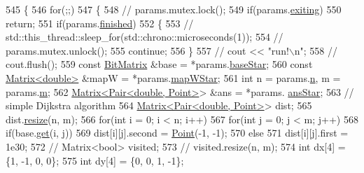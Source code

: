\begin{DoxyCode}
545 \{
546     \textcolor{keywordflow}{for}(;;)
547     \{
548         \textcolor{comment}{// params.mutex.lock();}
549         \textcolor{keywordflow}{if}(params.\hyperlink{structColumnGenSolve_1_1parDijkstraParams_a56efc1b9b760d7a8934f06406e2e61a0}{exiting})
550             \textcolor{keywordflow}{return};
551         \textcolor{keywordflow}{if}(params.\hyperlink{structColumnGenSolve_1_1parDijkstraParams_a72bfc9f9b0c4851bdb63715b053df511}{finished})
552         \{
553             \textcolor{comment}{// std::this\_thread::sleep\_for(std::chrono::microseconds(1));}
554             \textcolor{comment}{// params.mutex.unlock();}
555             \textcolor{keywordflow}{continue};
556         \}
557         \textcolor{comment}{// cout << "run!\(\backslash\)n";}
558         \textcolor{comment}{// cout.flush();}
559         \textcolor{keyword}{const} \hyperlink{classBitMatrix}{BitMatrix} &base = *params.\hyperlink{structColumnGenSolve_1_1parDijkstraParams_a6d66ec75238960aaf04d2d62058ea077}{baseStar};
560         \textcolor{keyword}{const} \hyperlink{classMatrix}{Matrix<double>} &mapW = *params.\hyperlink{structColumnGenSolve_1_1parDijkstraParams_ae0b35a1ba11e00c8ce3113b2a174042d}{mapWStar};
561         \textcolor{keywordtype}{int} n = params.\hyperlink{structColumnGenSolve_1_1parDijkstraParams_a33cbd8316dde8102d996c01ad2ae68d5}{n}, m = params.\hyperlink{structColumnGenSolve_1_1parDijkstraParams_a20f153fdd04ede56c8ec19f155e1e423}{m};
562         \hyperlink{classMatrix}{Matrix<Pair<double, Point>}> &ans = *params.
      \hyperlink{structColumnGenSolve_1_1parDijkstraParams_a6e3c1462f7a9a1714c190a83819cf632}{ansStar};
563         \textcolor{comment}{// simple Dijkstra algorithm}
564         \hyperlink{classMatrix}{Matrix<Pair<double, Point>}> dist;
565         dist.\hyperlink{classMatrix_a15ce96c8af4c7a982c2c10b96f29cea1}{resize}(n, m);
566         \textcolor{keywordflow}{for}(\textcolor{keywordtype}{int} i = 0; i < n; i++)
567             \textcolor{keywordflow}{for}(\textcolor{keywordtype}{int} j = 0; j < m; j++)
568                 \textcolor{keywordflow}{if}(base.\hyperlink{classBitMatrix_ad19d1045b54ccc8a99d70d38305b4ca6}{get}(i, j))
569                     dist[i][j].second = \hyperlink{classPoint}{Point}(-1, -1);
570                 \textcolor{keywordflow}{else}
571                     dist[i][j].first = 1e30;
572         \textcolor{comment}{// Matrix<bool> visited;}
573         \textcolor{comment}{// visited.resize(n, m);}
574         \textcolor{keywordtype}{int} dx[4] = \{1, -1, 0, 0\};
575         \textcolor{keywordtype}{int} dy[4] = \{0, 0, 1, -1\};

\end{DoxyCode}
